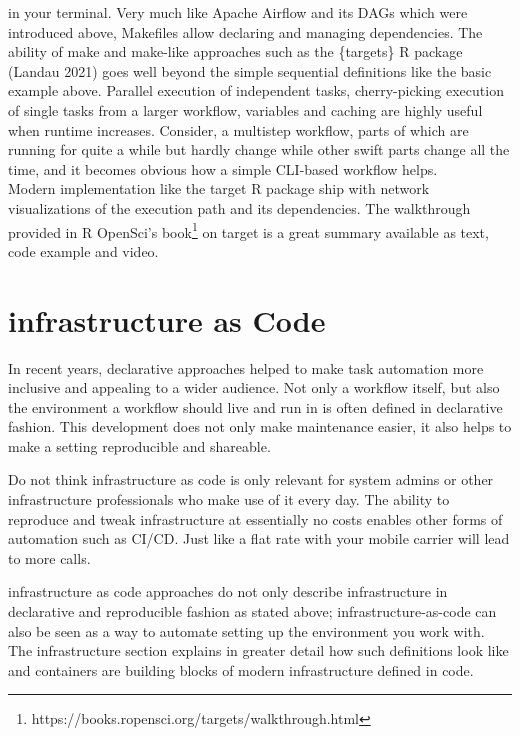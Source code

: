 \documentclass[
  12pt,
  letterpaper,
]{krantz}
\begin{document}
in your terminal. Very much like Apache Airflow
and its DAGs which were introduced above, Makefiles allow declaring and
managing dependencies. The ability of make and make-like approaches such
as the \{targets\} R package (Landau 2021) goes well beyond the simple
sequential definitions like the basic example above. Parallel execution
of independent tasks, cherry-picking execution of single tasks from a
larger workflow, variables and caching are highly useful when runtime
increases. Consider, a multistep workflow, parts of which are running
for quite a while but hardly change while other swift parts change all
the time, and it becomes obvious how a simple CLI-based workflow
helps.\\
Modern implementation like the target R package ship with network
visualizations of the execution path and its dependencies. The
walkthrough provided in R OpenSci's book\footnote{https://books.ropensci.org/targets/walkthrough.html}
on target is a great summary available as text, code example and video.

\hypertarget{infrastructure-as-code}{%
\section{\texorpdfstring{infrastructure as
Code}{infrastructure as Code}}\label{infrastructure-as-code}}

In recent years, declarative approaches helped to make task
automation more inclusive and appealing to a wider
audience. Not only a workflow itself, but also the environment a
workflow should live and run in is often defined in declarative fashion.
This development does not only make maintenance easier, it also helps to
make a setting reproducible and shareable.

Do not think infrastructure as code is only
relevant for system admins or other infrastructure
professionals who make use of it every day. The ability to reproduce and
tweak infrastructure at essentially no costs
enables other forms of automation such as
CI/CD. Just like a flat rate with your mobile carrier will
lead to more calls.

infrastructure as code approaches do not only
describe infrastructure in declarative and
reproducible fashion as stated above;
infrastructure-as-code can also be seen as a way
to automate setting up the environment you work with. The
infrastructure section explains in greater detail
how such definitions look like and containers are building blocks of
modern infrastructure defined in code.
\end{document}
